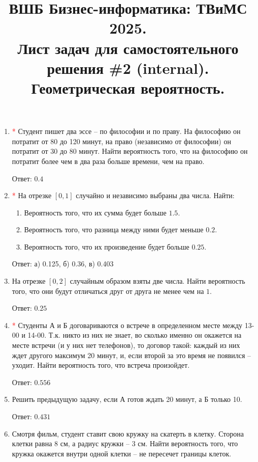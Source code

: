 \documentclass{article}
\title{ВШБ Бизнес-информатика: ТВиМС 2025. \\ Лист задач для самостоятельного решения \#2 (internal). \\ Геометрическая вероятность.}
\date{}
\author{}
\begin{document}
\maketitle

\begin{enumerate}
    \item \textcolor{red}{*} Студент пишет два эссе – по философии и по праву.
    На философию он потратит от 80 до 120 минут, на право (независимо от философии) он потратит от 30 до 80 минут.
    Найти вероятность того, что на философию он потратит более чем в два раза больше времени, чем на право.

    Ответ: $0.4$

    \item \textcolor{red}{*} На отрезке $[0,1]$ случайно и независимо выбраны два числа. Найти:
    \begin{enumerate}
        \item Вероятность того, что их сумма будет больше $1.5$.
        \item Вероятность того, что разница между ними будет меньше $0.2$.
        \item Вероятность того, что их произведение будет больше $0.25$.
    \end{enumerate}
    
    Ответ: а) 0.125,    б) 0.36,  в) 0.403

    \item На отрезке $[0,2]$ случайным образом взяты две числа.
    Найти вероятность того, что они будут отличаться друг от друга не менее чем на $1$.
    
    Ответ: $0.25$

    \item \textcolor{red}{*} Студенты А и Б договариваются о встрече в определенном месте между 13-00 и 14-00.
    Т.к. никто из них не знает, во сколько именно он окажется на месте встречи (и у них нет телефонов), то договор такой:
    каждый из них ждет другого максимум 20 минут, и, если второй за это время не появился – уходит.
    Найти вероятность того, что встреча произойдет.
    
    Ответ: $0.556$

    \item Решить предыдущую задачу, если А готов ждать 20 минут, а Б только 10.
    
    Ответ: $0.431$
    
    \item Смотря фильм, студент ставит свою кружку на скатерть в клетку.
    Сторона клетки равна 8 см, а радиус кружки – 3 см.
    Найти вероятность того, что кружка окажется внутри одной клетки – не пересечет границы клеток.
    

\end{enumerate}
\end{document}

